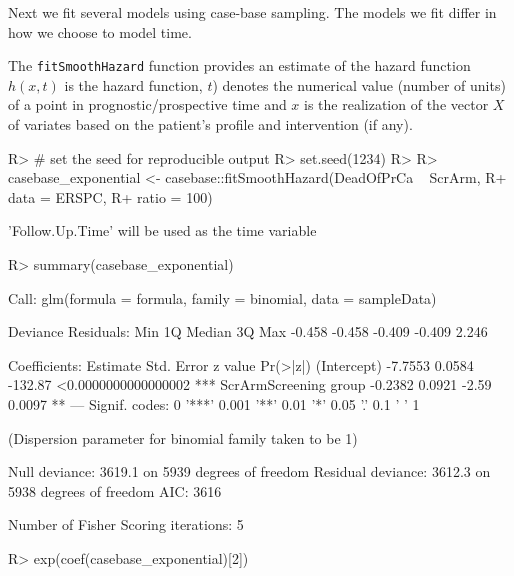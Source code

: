 \documentclass[article]{jss}
\begin{document}
Next we fit several models using case-base sampling. The models we fit
differ in how we choose to model time.

The \texttt{fitSmoothHazard} function provides an estimate of the hazard
function \(h(x, t)\) is the hazard function, \(t\)) denotes the
numerical value (number of units) of a point in prognostic/prospective
time and \(x\) is the realization of the vector \(X\) of variates based
on the patient's profile and intervention (if any).

\begin{CodeChunk}

\begin{CodeInput}
R> # set the seed for reproducible output
R> set.seed(1234)
R> 
R> casebase_exponential <- casebase::fitSmoothHazard(DeadOfPrCa ~ ScrArm, 
R+                                                   data = ERSPC, 
R+                                                   ratio = 100)
\end{CodeInput}

\begin{CodeOutput}
'Follow.Up.Time' will be used as the time variable
\end{CodeOutput}

\begin{CodeInput}
R> summary(casebase_exponential)
\end{CodeInput}

\begin{CodeOutput}

Call:
glm(formula = formula, family = binomial, data = sampleData)

Deviance Residuals: 
   Min      1Q  Median      3Q     Max  
-0.458  -0.458  -0.409  -0.409   2.246  

Coefficients:
                      Estimate Std. Error z value            Pr(>|z|)    
(Intercept)            -7.7553     0.0584 -132.87 <0.0000000000000002 ***
ScrArmScreening group  -0.2382     0.0921   -2.59              0.0097 ** 
---
Signif. codes:  0 '***' 0.001 '**' 0.01 '*' 0.05 '.' 0.1 ' ' 1

(Dispersion parameter for binomial family taken to be 1)

    Null deviance: 3619.1  on 5939  degrees of freedom
Residual deviance: 3612.3  on 5938  degrees of freedom
AIC: 3616

Number of Fisher Scoring iterations: 5
\end{CodeOutput}

\begin{CodeInput}
R> exp(coef(casebase_exponential)[2])
\end{CodeInput}


\end{CodeChunk}
\end{document}
